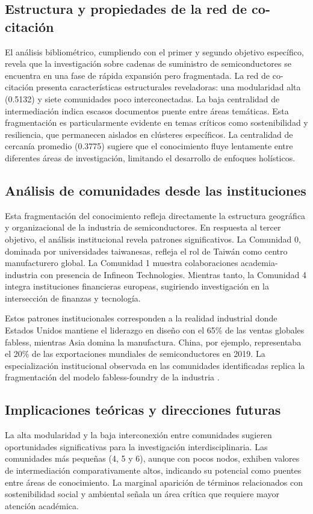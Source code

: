 \documentclass[twoside, twocolumn]{article}
\newcommand{\1}{\mathds{1}}						%
\begin{document}
\subsection{Estructura y propiedades de la red de co-citación}
El análisis bibliométrico, cumpliendo con el primer y segundo objetivo específico, revela que la investigación sobre cadenas de suministro de semiconductores se encuentra en una fase de rápida expansión pero fragmentada. La red de co-citación presenta características estructurales reveladoras: una modularidad alta (0.5132) y siete comunidades poco interconectadas. La baja centralidad de intermediación indica escasos documentos puente entre áreas temáticas. Esta fragmentación es particularmente evidente en temas críticos como sostenibilidad y resiliencia, que permanecen aislados en clústeres específicos. La centralidad de cercanía promedio (0.3775) sugiere que el conocimiento fluye lentamente entre diferentes áreas de investigación, limitando el desarrollo de enfoques holísticos.

\subsection{Análisis de comunidades desde las instituciones}

Esta fragmentación del conocimiento refleja directamente la estructura geográfica y organizacional de la industria de semiconductores. En respuesta al tercer objetivo, el análisis institucional revela patrones significativos. La Comunidad 0, dominada por universidades taiwanesas, refleja el rol de Taiwán como centro manufacturero global. La Comunidad 1 muestra colaboraciones academia-industria con presencia de Infineon Technologies. Mientras tanto, la Comunidad 4 integra instituciones financieras europeas, sugiriendo investigación en la intersección de finanzas y tecnología.

Estos patrones institucionales corresponden a la realidad industrial donde Estados Unidos mantiene el liderazgo en diseño con el 65\% de las ventas globales fabless, mientras Asia domina la manufactura. China, por ejemplo, representaba el 20\% de las exportaciones mundiales de semiconductores en 2019. La especialización institucional observada en las comunidades identificadas replica la fragmentación del modelo fabless-foundry de la industria \cite{Bown2020}.

\subsection{Implicaciones teóricas y direcciones futuras}
La alta modularidad y la baja interconexión entre comunidades sugieren oportunidades significativas para la investigación interdisciplinaria. Las comunidades más pequeñas (4, 5 y 6), aunque con pocos nodos, exhiben valores de intermediación comparativamente altos, indicando su potencial como puentes entre áreas de conocimiento. La marginal aparición de términos relacionados con sostenibilidad social y ambiental señala un área crítica que requiere mayor atención académica.
\end{document}
